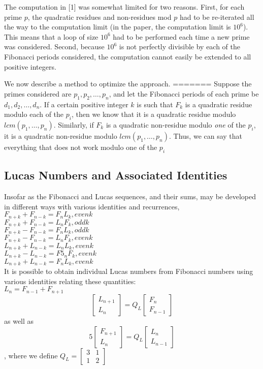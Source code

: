\documentclass[11pt]{article}
\begin{document}
The computation in [1] was somewhat limited for two reasons. First, for each prime $p$, the quadratic residues and non-residues mod $p$ had to be re-iterated all the way to the computation limit (in the paper, the computation limit is $10^6$). This means that a loop of size $10^6$ had to be performed each time a new prime was considered. Second, because $10^6$ is not perfectly divisible by each of the Fibonacci periods considered, the computation cannot easily be extended to all positive integers. 

We now describe a method to optimize the approach. 
=======
Suppose the primes considered are $p_1, p_2, \dots , p_n$, and let the Fibonacci periods of each prime be $d_1, d_2, \dots , d_n$. If a certain positive integer $k$ is such that $F_k$ is a quadratic residue modulo each of the $p_i$, then we know that it is a quadratic residue modulo $lcm(p_1, \dots , p_n)$. Similarly, if $F_k$ is a quadratic non-residue modulo \textit{one} of the $p_i$, it is a quadratic non-residue modulo $lcm(p_1, \dots , p_n)$. Thus, we can say that everything that does not work modulo one of the $p_i$ 

\subsection{Lucas Numbers and Associated Identities}
Insofar as the Fibonacci and Lucas sequences, and their sums, may be developed in different ways with various identities and recurrences, 
$F_{n+k} + F_{n-k} = F_{n}L_{k}, even k$\\
$F_{n+k} + F_{n-k} = L_{n}F_{k}, odd k$\\$F_{n+k} - F_{n-k} = F_{n}L_{k}, odd k$ \\ $F_{n+k} - F_{n-k} = L_{n}F_{k}, even k$ \\ $L_{n+k} + L_{n-k} = L_{n}L_{k}, even k$ \\ $L_{n+k} - L_{n-k} = F5_{n}F_{k}, even k$ \\ $L_{n+k} + L_{n-k} = F_{n}L_{k}, even k$\\ It is possible to obtain individual Lucas numbers from Fibonacci numbers using various identities relating these quantities:\\$L_{n} = F_{n-1} + F_{n+1}$ \\ 
\[
\begin{bmatrix}
L_{n+1} \\
L_{n}
\end{bmatrix} = Q_{L} \begin{bmatrix} F_{n} \\ F_{n-1}\end{bmatrix}
\] 
as well as \\
\[
5\begin{bmatrix}
F_{n+1} \\
L_{n}
\end{bmatrix} = Q_{L} \begin{bmatrix} L_{n} \\ L_{n-1}\end{bmatrix}
\] , where we define $Q_{L} = \begin{bmatrix} 3 & 1 \\ 1 & 2 \end{bmatrix}$
\end{document}
